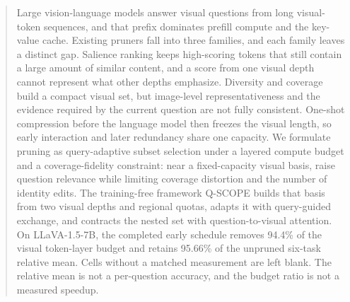 \begin{abstract}
Large vision-language models answer visual questions from long visual-token sequences, and that prefix dominates prefill compute and the key-value cache. Existing pruners fall into three families, and each family leaves a distinct gap. Salience ranking keeps high-scoring tokens that still contain a large amount of similar content, and a score from one visual depth cannot represent what other depths emphasize. Diversity and coverage build a compact visual set, but image-level representativeness and the evidence required by the current question are not fully consistent. One-shot compression before the language model then freezes the visual length, so early interaction and later redundancy share one capacity. We formulate pruning as query-adaptive subset selection under a layered compute budget and a coverage-fidelity constraint: near a fixed-capacity visual basis, raise question relevance while limiting coverage distortion and the number of identity edits. The training-free framework Q-SCOPE builds that basis from two visual depths and regional quotas, adapts it with query-guided exchange, and contracts the nested set with question-to-visual attention. On LLaVA-1.5-7B, the completed early schedule removes 94.4\% of the visual token-layer budget and retains 95.66\% of the unpruned six-task relative mean. Cells without a matched measurement are left blank. The relative mean is not a per-question accuracy, and the budget ratio is not a measured speedup.
\end{abstract}
